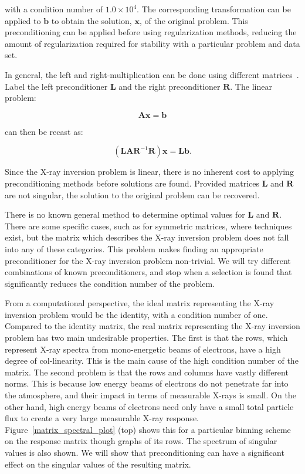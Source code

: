 with a condition number of $1.0\times10^{4}$. The corresponding transformation can be applied to $\mathbf{b}$ to obtain the solution, $\mathbf{x}$, of the original problem. This preconditioning can be applied before using regularization methods, reducing the amount of regularization required for stability with a  particular problem and data set. 

In general, the left and right-multiplication can be done using different matrices~\citep{Bouwmeester2015}. Label the left preconditioner $\mathbf{L}$ and the right preconditioner $\mathbf{R}$. The linear problem:

$$\mathbf{A}\mathbf{x} = \mathbf{b}$$

can then be recast as:

$$(\mathbf{L}\mathbf{A}\mathbf{R}^{-1}\mathbf{R})\mathbf{x} = \mathbf{L}\mathbf{b}.$$

Since the X-ray inversion problem is linear, there is no inherent cost to applying preconditioning methods before solutions are found. Provided matrices $\mathbf{L}$ and $\mathbf{R}$ are not singular, the solution to the original problem can be recovered. 

There is no known general method to determine optimal values for $\mathbf{L}$ and $\mathbf{R}$. There are some specific cases, such as for symmetric matrices, where techniques exist, but the matrix which describes the X-ray inversion problem does not fall into any of these categories. This problem makes finding an appropriate preconditioner for the X-ray inversion problem non-trivial. We will try different combinations of known preconditioners, and stop when a selection is found that significantly reduces the condition number of the problem. 

From a computational perspective, the ideal matrix representing the X-ray inversion problem would be the identity, with a condition number of one. Compared to the identity matrix, the real matrix representing the X-ray inversion problem has two main undesirable properties. The first is that the rows, which represent X-ray spectra from mono-energetic beams of electrons, have a high degree of col-linearity. This is the main cause of the high condition number of the matrix. The second problem is that the rows and columns have vastly different norms. This is because low energy beams of electrons do not penetrate far into the atmosphere, and their impact in terms of measurable X-rays is small. On the other hand, high energy beams of electrons need only have a small total particle flux to create a very large measurable X-ray response. Figure~\ref{matrix_spectral_plot} (top) shows this for a particular binning scheme on the response matrix though graphs of its rows. The spectrum of singular values is also shown. We will show that preconditioning can have a significant effect on the singular values of the resulting matrix. 

